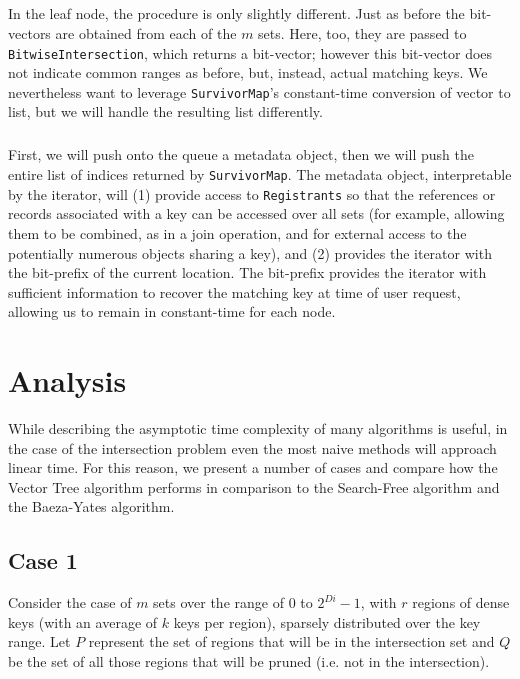 \documentclass[11pt,letterpaper]{article}
\begin{document}
\subparagraph{}
In the leaf node, the procedure is only slightly different.  Just as before
the bit-vectors are obtained from each of the $m$ sets.  Here, too, they
are passed to {\tt BitwiseIntersection}, which returns a bit-vector; however
this bit-vector does not indicate common ranges as before, but, instead,
 actual matching keys.  We nevertheless want to leverage {\tt SurvivorMap}'s
constant-time conversion of vector to list, but we will handle the resulting list differently.

\subparagraph{}
First, we will push onto the queue a metadata object, then we will push the 
entire list of indices returned by {\tt SurvivorMap}.  The metadata object, 
interpretable by the iterator, will (1) provide access to {\tt Registrants} so that
the references or records associated with a key can be accessed over all sets
(for example, allowing them to be combined, as in a join operation, and for 
external access to the potentially numerous objects sharing a key), and
(2) provides the iterator with the bit-prefix of the current location.  The bit-prefix
provides the iterator with sufficient information to recover the matching key
at time of user request, allowing us to remain in constant-time for each node.

	

\section{Analysis}

While describing the asymptotic time complexity of many algorithms is useful,
in the case of the intersection problem even the most naive methods will
approach linear time.  For this reason, we present a number of cases and
compare how the Vector Tree algorithm performs in comparison to the Search-Free
algorithm and the Baeza-Yates algorithm.

\subsection{Case 1}
Consider the case of $m$ sets over the range of $0$ to $2^{Di} - 1$,
with $r$ regions of dense keys (with an average of $k$ keys per region),
sparsely distributed over the key range.  Let $P$ represent the set of
regions that will be in the intersection set and $Q$ be the set of all those
regions that will be pruned (i.e. not in the intersection).
\end{document}
